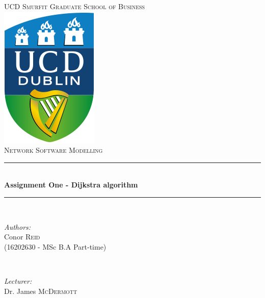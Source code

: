 \documentclass[paper=a4, fontsize=11pt]{scrartcl} %
\begin{document}
\begin{titlepage}

\newcommand{\HRule}{\rule{\linewidth}{0.5mm}} %

\center %
 

\textsc{\LARGE UCD Smurfit Graduate School of Business}\\[1.5cm] %
\includegraphics[scale = 0.6]{images/logo.png} \\ [1cm]
\textsc{\Large Network Software Modelling}\\[0.5cm] %


\HRule \\[0.4cm]
{ \LARGE \bfseries Assignment One - Dijkstra algorithm}\\[0.4cm] %
\HRule \\[1.5cm]
 

\begin{minipage}{0.4\textwidth}
\begin{flushleft} \large
\emph{Authors:}\\
\small{Conor \textsc{Reid}\\ (16202630 - MSc B.A Part-time)} %
\end{flushleft}
\end{minipage}
~
\begin{minipage}{0.4\textwidth}
\begin{flushright} \large
\emph{Lecturer:} \\
Dr. James \textsc{McDermott} %
\end{flushright}
\end{minipage}\\[4cm]


\end{titlepage}
\end{document}
